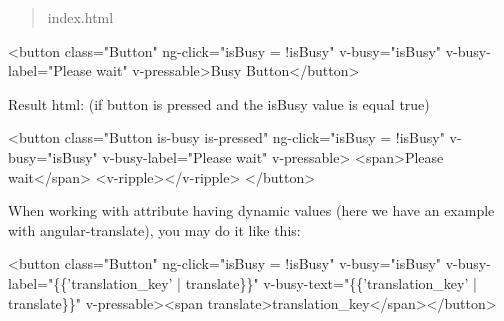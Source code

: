 \begin{quote}
index.\+html \end{quote}



\begin{DoxyCode}
<button class="Button" ng-click="isBusy = !isBusy" v-busy="isBusy" v-busy-label="Please wait"
       v-pressable>Busy Button</button>
\end{DoxyCode}


Result html\+: (if button is pressed and the {\ttfamily is\+Busy} value is equal {\ttfamily true})


\begin{DoxyCode}
<button class="Button is-busy is-pressed" ng-click="isBusy = !isBusy" v-busy="isBusy" v-busy-label="Please
       wait" v-pressable>
  <span>Please wait</span>
  <v-ripple></v-ripple>
</button>
\end{DoxyCode}


When working with attribute having dynamic values (here we have an example with angular-\/translate), you may do it like this\+:


\begin{DoxyCode}
<button class="Button" ng-click="isBusy = !isBusy" v-busy="isBusy" v-busy-label="\{\{'translation\_key' |
       translate\}\}" v-busy-text="\{\{'translation\_key' | translate\}\}"  v-pressable><span
       translate>translation\_key</span></button>
\end{DoxyCode}
 